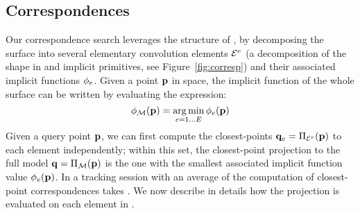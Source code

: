 \label{sec:model} %

\subsection{Correspondences}
\label{sec:corresp}
Our correspondence search leverages the structure of , by decomposing the surface into several elementary convolution elements $\mathcal{E}^e$
 (a decomposition of the shape in  and  implicit primitives, see Figure~\ref{fig:corresp}) and their associated implicit functions $\phi_e$.
 Given a point $\mathbf{p}$ in space, the implicit function of the whole surface can be written by evaluating the expression:
\begin{equation}
\phi_{\mathcal{M}}(\mathbf{p}) = \operatorname*{arg\,min}_{e=1 \dots E} \phi_e(\mathbf{p})
\label{eq:piecewise}
\end{equation}
%
Given a query point $\mathbf{p}$, we can first compute the closest-points $\mathbf{q}_e = \Pi_{\mathcal{E}^e}(\mathbf{p})$ to each element independently; within this set, the closest-point projection to the full model $\mathbf{q} = \Pi_{\mathcal{M}}(\mathbf{p})$ is the one with the smallest associated implicit function value $\phi_e(\mathbf{p})$. In a tracking session with an average of  the computation of closest-point correspondences takes . We now describe in details how the projection is evaluated on each element in . 


